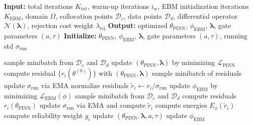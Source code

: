 \documentclass{article}
\theoremstyle{plain}
\theoremstyle{definition}
\theoremstyle{remark}
\begin{document}
\begin{algorithm}[t]
\caption{Noise-Adaptive PINN (naPINN)}
\label{alg:napinn}
\begin{algorithmic}[1]
\STATE \textbf{Input:} total iterations $K_{\text{tot}}$, warm-up iterations $i_{w}$, EBM initialization iterations $K_{\text{EBM}}$,
domain $\Omega$, collocation points $\mathcal{D}_c$, data points $\mathcal{D}_d$,
differential operator $\mathcal{N}(\boldsymbol{\lambda})$, rejection cost weight $\lambda_{\text{rej}}$
\STATE \textbf{Output:} optimized $\theta_{\text{PINN}}$, $\phi_\text{EBM}$, $\boldsymbol{\lambda}$, gate parameters $(a,\tau)$
\STATE \textbf{Initialize:} $\theta_{\text{PINN}}$, $\phi_\text{EBM}$, $\boldsymbol{\lambda}$, gate parameters $(a,\tau)$, running std $\sigma_{\text{run}}$

        \STATE sample minibatch from $\mathcal{D}_c$ and $\mathcal{D}_d$
        \STATE update $(\theta_{\text{PINN}},\boldsymbol{\lambda})$ by minimizing $\mathcal{L}_{\text{PINN}}$ 
        \STATE compute residual $\{r_i(\theta^{(0)})\}$ with $(\theta_{\text{PINN}},\boldsymbol{\lambda})$
            \STATE sample minibatch of residuals
            \STATE update $\sigma_{\text{run}}$ via EMA
            \STATE normalize residuals $\tilde r_i \leftarrow r_i / \sigma_{\text{run}}$
            \STATE update $\phi_\text{EBM}$ by minimizing $\mathcal{L}_{\text{EBM}}(\phi)$
        \ENDFOR 
    \ELSE
        \STATE sample minibatch from $\mathcal{D}_c$ and $\mathcal{D}_d$
        \STATE compute residuals $r_i(\theta_{\text{PINN}})$
        \STATE update $\sigma_{\text{run}}$ via EMA and compute $\tilde r_i$
        \STATE compute energies $E_\phi(\tilde r_i)$ 
        \STATE compute reliability weight $g_i$
        \STATE update $(\theta_{\text{PINN}},\boldsymbol{\lambda},a,\tau)$
        \STATE update $\phi_\text{EBM}$
    \ENDIF
\ENDFOR
\end{algorithmic}
\end{algorithm}
\end{document}
